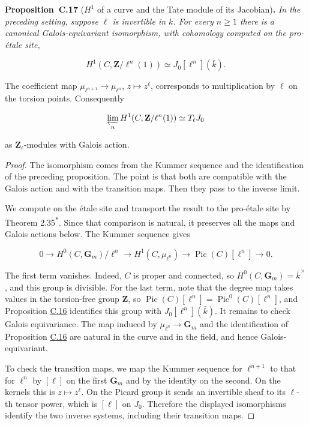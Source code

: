 \documentclass[11pt]{article}
\newenvironment{bpstatement}[2]{\par\addvspace{0.6\baselineskip}\noindent\textbf{#1}#2\textbf{.}\enspace\ignorespaces}
  {\par\addvspace{0.4\baselineskip}}
\newenvironment{bpstatementit}[2]{\begin{bpstatement}{#1}{#2}\itshape\ignorespaces}{\end{bpstatement}}
\newcommand{\bpout}[1]{#1\textsuperscript{\hyperlink{bp-outside}{\ensuremath{\ast}}}}
\begin{document}
\label{bp52}%
\begin{bpstatementit}{Proposition~C.17}{ ($H^1$ of a curve and the Tate module of its Jacobian)}
In the preceding setting, suppose \(\ell\) is invertible in \(k\). For every \(n\geq1\) there is a canonical Galois-equivariant isomorphism, with cohomology computed on the pro-étale site,

\[
H^1(C,\mathbf Z/\ell^n(1))
\simeq J_0[\ell^n](\bar k).
\]

The coefficient map \(\mu_{\ell^{n+1}}\to\mu_{\ell^n}\), \(z\mapsto z^\ell\), corresponds to multiplication by \(\ell\) on the torsion points. Consequently

\[
\varprojlim_n H^1(C,\mathbf Z/\ell^n(1))\simeq T_\ell J_0
\]

as \(\mathbf Z_\ell\)-modules with Galois action.
\end{bpstatementit}

\begin{proof}[{Proof}]\label{bp53}%
The isomorphism comes from the Kummer sequence and the identification of the preceding proposition. The point is that both are compatible with the Galois action and with the transition maps. Then they pass to the inverse limit.

We compute on the étale site and transport the result to the pro-étale site by Theorem \bpout{2.35}. Since that comparison is natural, it preserves all the maps and Galois actions below. The Kummer sequence gives

\[
0\longrightarrow
H^0(C,\mathbf G_m)/\ell^n
\longrightarrow H^1(C,\mu_{\ell^n})
\longrightarrow\operatorname{Pic}(C)[\ell^n]
\longrightarrow0.
\]

The first term vanishes. Indeed, \(C\) is proper and connected, so \(H^0(C,\mathbf G_m)=\bar k^{\times}\), and this group is divisible. For the last term, note that the degree map takes values in the torsion-free group \(\mathbf Z\), so \(\operatorname{Pic}(C)[\ell^n]=\operatorname{Pic}^0(C)[\ell^n]\), and Proposition \hyperref[bp49]{C.16} identifies this group with \(J_0[\ell^n](\bar k)\). It remains to check Galois equivariance. The map induced by \(\mu_{\ell^n}\to\mathbf G_m\) and the identification of Proposition \hyperref[bp49]{C.16} are natural in the curve and in the field, and hence Galois-equivariant.

To check the transition maps, we map the Kummer sequence for \(\ell^{n+1}\) to that for \(\ell^n\) by \([\ell]\) on the first \(\mathbf G_m\) and by the identity on the second. On the kernels this is \(z\mapsto z^\ell\). On the Picard group it sends an invertible sheaf to its \(\ell\)-th tensor power, which is \([\ell]\) on \(J_0\). Therefore the displayed isomorphisms identify the two inverse systems, including their transition maps.
\end{proof}
\end{document}
